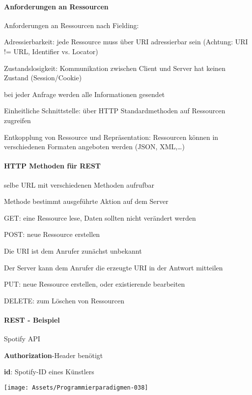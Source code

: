 \documentclass[10pt]{article}
\begin{document}
\paragraph{Anforderungen an Ressourcen}
Anforderungen an Ressourcen nach Fielding: 
\begin{enumerate*}
  \item Adressierbarkeit: jede Ressource muss über URI adressierbar sein (Achtung: URI != URL, Identifier vs. Locator)
  \item Zustandslosigkeit: Kommunikation zwischen Client und Server hat keinen Zustand (Session/Cookie)
  \begin{itemize*}
    \item bei jeder Anfrage werden alle Informationen gesendet
  \end{itemize*}
  \item Einheitliche Schnittstelle: über HTTP Standardmethoden auf Ressourcen zugreifen
  \item Entkopplung von Ressource und Repräsentation: Ressourcen können in verschiedenen Formaten angeboten werden (JSON, XML,…)
\end{enumerate*}

\paragraph{HTTP Methoden für REST}
\begin{itemize*}
  \item selbe URL mit verschiedenen Methoden aufrufbar
  \item Methode bestimmt ausgeführte Aktion auf dem Server
\end{itemize*}
\begin{itemize*}
  \item[GET:] eine Ressource lese, Daten sollten nicht verändert werden
  \item[POST:] neue Ressource erstellen
  \begin{itemize*}
    \item Die URI ist dem Anrufer zunächst unbekannt
    \item Der Server kann dem Anrufer die erzeugte URI in der Antwort mitteilen
  \end{itemize*}
  \item[PUT:] neue Ressource erstellen, oder existierende bearbeiten
  \item[DELETE:] zum Löschen von Ressourcen
\end{itemize*}

\paragraph{REST - Beispiel}
Spotify API
\begin{itemize*}
  \item \textbf{Authorization}-Header benötigt
  \item \textbf{id}: Spotify-ID eines Künstlers
\end{itemize*}
\begin{center}
  \centering
  \texttt{[image: Assets/Programmierparadigmen-038]}
\end{center}
\end{document}
